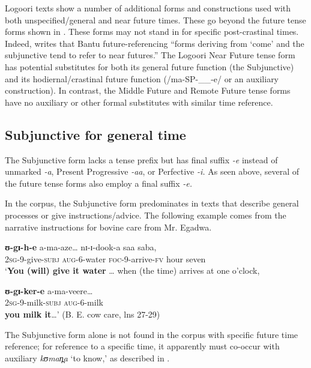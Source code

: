 \documentclass[output=paper]{langsci/langscibook}
\begin{document}
Logoori texts show a number of additional forms and constructions used with both unspecified/general and near future times. These go beyond the future tense forms shown in . These forms may not stand in for specific post-crastinal times. Indeed, \citet[85]{Nurse2008} writes that Bantu future-referencing “forms deriving from ‘come’ and the subjunctive tend to refer to near futures.” The Logoori Near Future tense form has potential substitutes for both its general future function (the Subjunctive) and its hodiernal/crastinal future function (/ma-SP-\_\_-e/ or an auxiliary construction). In contrast, the Middle Future and Remote Future tense forms have no auxiliary or other formal substitutes with similar time reference.

\subsection{Subjunctive for general time} \label{sec:sarvasy:7.1}

The Subjunctive form lacks a tense prefix but has final suffix \textit{{}-e }instead of unmarked \textit{{}-a}, Present Progressive \textit{{}-aa}, or Perfective \textit{{}-i. }As seen above, several of the future tense forms also employ a final suffix \textit{{}-e. }

In the corpus, the Subjunctive form predominates in texts that describe general processes or give instructions/advice. The following example comes from the narrative instructions for bovine care from Mr. Egadwa. 

\ea\label{ex:sarvasy:18}
\gll \textbf{ʊ{}-gɪ-h-e}     a-ma-aze…   nɪ-ɪ{}-dook-a   saa   saba, \\  
\textsc{\textup{2sg}}\textsc{{}-}9-give-\textsc{subj}  \textsc{aug}{}-6-water  \textsc{foc}{}-9-arrive-\textsc{fv}  hour  seven \\
\glt ‘\textbf{You (will) give it water} … when (the time) arrives at one o’clock,

\gll \textbf{ʊ{}-gɪ-ker-e}   a-ma-veere\ldots \\
\textsc{2sg}{}-9-milk-\textsc{subj}  \textsc{aug}{}-6-milk \\
\glt \textbf{you milk it}…’ (B. E. cow care, lns 27-29)
\z

The Subjunctive form alone is not found in the corpus with specific future time reference; for reference to a specific time, it apparently must co-occur with auxiliary \textit{kʊman̪a }‘to know,’ as described in . 
\end{document}
